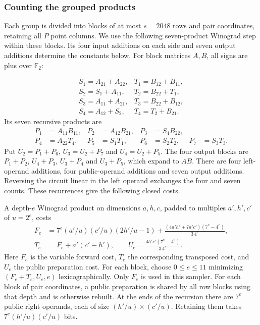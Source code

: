 \documentclass[b5paper, 10pt, abstract=true, captions=tableheading]{scrartcl}
\theoremstyle{plain}
\theoremstyle{definition}
\newcommand{\FF}{\mathds{F}}
\begin{document}
\subsubsection{Counting the grouped products}
Each group is divided into blocks of at most $s=2048$ rows and pair
coordinates, retaining all $P$ point columns. We use the following
seven-product Winograd step within these blocks. Its four input additions
on each side and seven output additions determine the constants below.
For block matrices $A,B$, all signs are plus over $\FF_2$:

\[
\begin{array}{ll}
 S_1=A_{21}+A_{22},&T_1=B_{12}+B_{11},\\
 S_2=S_1+A_{11},&T_2=B_{22}+T_1,\\
 S_3=A_{11}+A_{21},&T_3=B_{22}+B_{12},\\
 S_4=A_{12}+S_2,&T_4=T_2+B_{21}.
\end{array}
\]
Its seven recursive products are
\[
\begin{aligned}
 P_1&=A_{11}B_{11},&P_2&=A_{12}B_{21},&P_3&=S_4B_{22},\\
 P_4&=A_{22}T_4,&P_5&=S_1T_1,&P_6&=S_2T_2,&P_7&=S_3T_3.
\end{aligned}
\]
Put $U_2=P_1+P_6$, $U_3=U_2+P_7$ and $U_4=U_2+P_5$.
The four output blocks are $P_1+P_2$, $U_4+P_3$, $U_3+P_4$ and
$U_3+P_5$, which expand to $AB$.
There are four left-operand additions, four public-operand additions and
seven output additions. Reversing the circuit linear in the left operand
exchanges the four and seven counts. These recurrences give the following
closed costs.

A depth-\(e\) Winograd product on dimensions \(a,h,c\),
padded to multiples \(a',h',c'\) of \(u=2^e\), costs
\[
 \begin{split}
 F_e&=7^e(a'/u)(c'/u)(2h'/u-1)
       +\frac{(4a'h'+7a'c')(7^e-4^e)}{3\,4^e},\\
 T_e&=F_e+a'(c'-h'),\qquad
 U_e=\frac{4h'c'(7^e-4^e)}{3\,4^e}.
 \end{split}
\]
Here \(F_e\) is the variable forward cost, \(T_e\) the corresponding
transposed cost,
and \(U_e\) the public preparation cost. For each block, choose
\(0\le e\le11\) minimizing \((F_e+T_e,U_e,e)\) lexicographically.
Only \(F_e\) is used in this sampler. For each block of pair coordinates, a public
preparation is shared by all row blocks using that depth and is otherwise
rebuilt. At the ends of the recursion there are $7^e$ public right operands,
each of size $(h'/u)\times(c'/u)$. Retaining them takes
$7^e(h'/u)(c'/u)$ bits.
\end{document}
